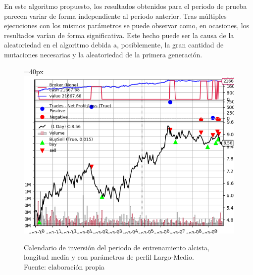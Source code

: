 En este algoritmo propuesto, los resultados obtenidos  para el periodo de prueba parecen variar de forma independiente al periodo anterior. Tras m\'ultiples ejecuciones con los mismos par\'ametros se puede observar como, en ocasiones, los resultados var\'ian de forma significativa. Este hecho puede ser la causa de la aleatoriedad en el algoritmo debida a, posiblemente, la gran cantidad de mutaciones necesarias y la aleatoriedad de la primera generaci\'on.\\

     	\begin{figure}[H]
     		\centering\leftskip=40px
     		\includegraphics[scale=0.66]{imagenes/M_Large-Medium_train.png}
     		\caption[Calendario de inversi\'on del periodo de entrenamiento largo.]{Calendario de inversi\'on del periodo de entrenamiento alcista, longitud media y con par\'ametros de perfil Largo-Medio.\\ Fuente: elaboraci\'on propia}
     		\label{fig:medium_period_mtrain}
     	\end{figure}
     	
